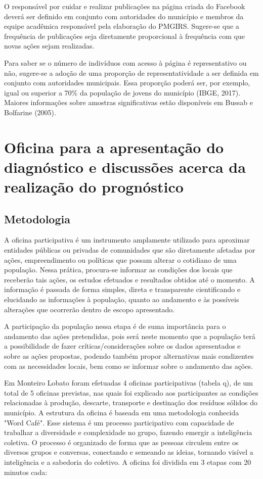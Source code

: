 O responsável por cuidar e realizar publicações na página criada do Facebook deverá ser definido em conjunto com autoridades do município e membros da equipe acadêmica responsável pela elaboração do PMGIRS. Sugere-se que a frequência de publicações seja diretamente proporcional à frequência com que novas ações sejam realizadas.

Para saber se o número de indivíduos com acesso à página é representativo ou não, sugere-se a adoção de uma proporção de representatividade a ser definida em conjunto com autoridades municipais. Essa proporção poderá ser, por exemplo, igual ou superior a 70\% da população de jovens do município (IBGE, 2017). Maiores informações sobre amostras significativas estão disponíveis em Bussab e Bolfarine (2005).


\section{Oficina para a apresentação do diagnóstico e discussões acerca da realização do prognóstico}

\subsection{Metodologia}

A oficina participativa é um instrumento amplamente utilizado para aproximar entidades públicas ou privadas de comunidades que são diretamente afetadas por ações, empreendimento ou políticas que possam alterar o cotidiano de uma população. Nessa prática, procura-se informar as condições dos locais que receberão tais ações, os estudos efetuados e resultados obtidos até o momento. A informação é passada de forma simples, direta e transparente cientificando e elucidando as informações à população, quanto ao andamento e às possíveis alterações que ocorrerão dentro de escopo apresentado.

A participação da população nessa etapa é de suma importância para o andamento das ações pretendidas, pois será neste momento que a população terá a possibilidade de fazer críticas/considerações sobre os dados apresentados e sobre as ações propostas, podendo também propor alternativas mais condizentes com as necessidades locais, bem como se informar sobre o andamento das ações.

Em Monteiro Lobato foram efetuadas 4 oficinas participativas (tabela q), de um total de 5 oficinas previstas, nas quais foi explicado aos participantes as condições relacionadas à produção, descarte, transporte e destinação dos resíduos sólidos do município. A estrutura da oficina é baseada em uma metodologia conhecida "Word Café". Esse sistema é um processo participativo com capacidade de trabalhar a diversidade e complexidade no grupo, fazendo emergir a inteligência coletiva. O processo é organizado de forma que as pessoas circulem entre os diversos grupos e conversas, conectando e semeando as ideias, tornando visível a inteligência e a sabedoria do coletivo. A oficina foi dividida em 3 etapas com 20 minutos cada: 

